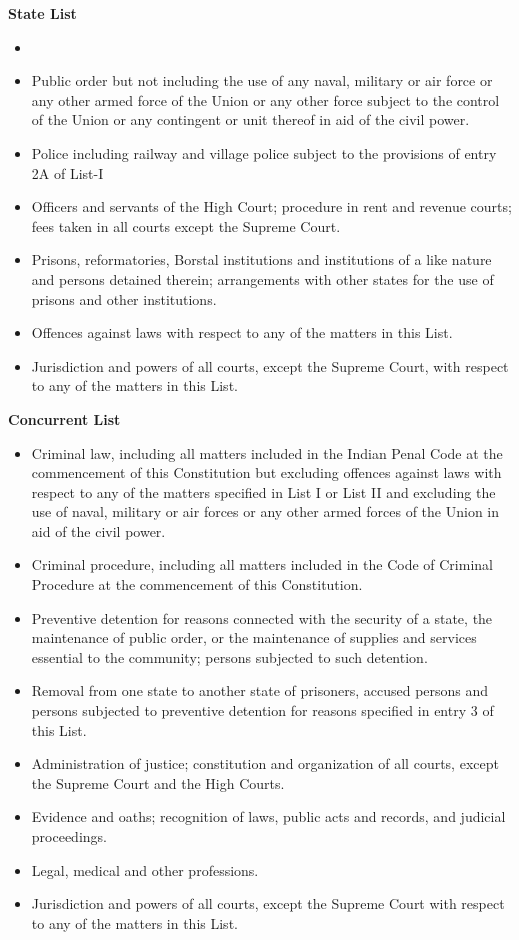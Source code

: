 \documentclass[11pt]{article}
\begin{document}
\textbf{State List}

\begin{itemize}
	\item
	\item Public order but not including the use of any naval, military or air force or any other armed force of the Union or any other force subject to the control of the Union or any contingent or unit thereof in aid of the civil power.
	\item Police including railway and village police subject to the provisions of entry 2A of List-I
	\item Officers and servants of the High Court; procedure in rent and revenue courts; fees taken in all courts except the Supreme Court.
	\item Prisons, reformatories, Borstal institutions and institutions of a like nature and persons detained therein; arrangements with other states for the use of prisons and other institutions.
	\item Offences against laws with respect to any of the matters in this List.
	\item Jurisdiction and powers of all courts, except the Supreme Court, with respect to any of the matters in this List.

\end{itemize}

\textbf{Concurrent List}

\begin{itemize}

	\item Criminal law, including all matters included in the Indian Penal Code at the commencement of this Constitution but excluding offences against laws with respect to any of the matters specified in List I or List II and excluding the use of naval, military or air forces or any other armed forces of the Union in aid of the civil power.
	\item Criminal procedure, including all matters included in the Code of Criminal Procedure at the commencement of this Constitution.
	\item Preventive detention for reasons connected with the security of a state, the maintenance of public order, or the maintenance of supplies and services essential to the community; persons subjected to such detention.
	\item Removal from one state to another state of prisoners, accused persons and persons subjected to preventive detention for reasons specified in entry 3 of this List.
	\item Administration of justice; constitution and organization of all courts, except the Supreme Court and the High Courts.
	\item Evidence and oaths; recognition of laws, public acts and records, and judicial proceedings.
	\item Legal, medical and other professions.
	\item Jurisdiction and powers of all courts, except the Supreme Court with respect to any of the matters in this List.

\end{itemize}
\end{document}
